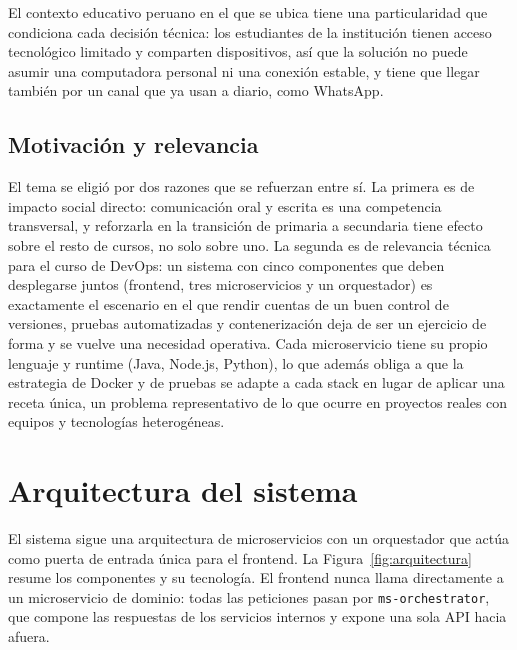 \documentclass[12pt,a4paper]{article}
\begin{document}
El contexto educativo peruano en el que se ubica
tiene una particularidad que condiciona cada decisión técnica: los estudiantes de la institución
tienen acceso tecnológico limitado y comparten dispositivos, así que la solución no puede asumir
una computadora personal ni una conexión estable, y tiene que llegar también por un canal que ya
usan a diario, como WhatsApp.

\subsection{Motivación y relevancia}

El tema se eligió por dos razones que se refuerzan entre sí. La primera es de impacto social
directo: comunicación oral y escrita es una competencia transversal, y reforzarla en la transición
de primaria a secundaria tiene efecto sobre el resto de cursos, no solo sobre uno. La segunda es
de relevancia técnica para el curso de DevOps: un sistema con cinco componentes que deben
desplegarse juntos (frontend, tres microservicios y un orquestador) es exactamente el escenario en
el que rendir cuentas de un buen control de versiones, pruebas automatizadas y contenerización deja
de ser un ejercicio de forma y se vuelve una necesidad operativa. Cada microservicio tiene su
propio lenguaje y runtime (Java, Node.js, Python), lo que además obliga a que la estrategia de
Docker y de pruebas se adapte a cada stack en lugar de aplicar una receta única, un problema
representativo de lo que ocurre en proyectos reales con equipos y tecnologías heterogéneas.

\section{Arquitectura del sistema}
\label{sec:arquitectura}

El sistema sigue una arquitectura de microservicios con un orquestador que actúa como puerta de
entrada única para el frontend. La Figura~\ref{fig:arquitectura} resume los componentes y su
tecnología. El frontend nunca llama directamente a un microservicio de dominio: todas las
peticiones pasan por \texttt{ms-orchestrator}, que compone las respuestas de los servicios
internos y expone una sola API hacia afuera.
\end{document}

